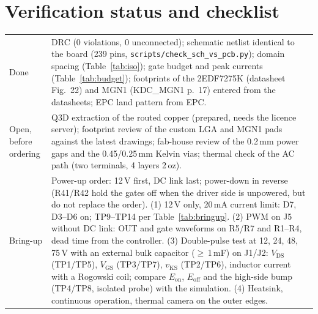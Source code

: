 \documentclass[10pt,a4paper]{article}
\begin{document}
\section{Verification status and checklist}
\begin{table}[H]
\centering\small
\begin{tabularx}{\textwidth}{@{}lX@{}}
\toprule
Done & DRC (0 violations, 0 unconnected); schematic netlist identical to the board (239 pins, \texttt{scripts/check\_sch\_vs\_pcb.py}); domain spacing (Table~\ref{tab:iso}); gate budget and peak currents (Table~\ref{tab:budget}); footprints of the 2EDF7275K (datasheet Fig.~22) and MGN1 (KDC\_MGN1 p.~17) entered from the datasheets; EPC land pattern from EPC. \\
Open, before ordering & Q3D extraction of the routed copper (prepared, needs the licence server); footprint review of the custom LGA and MGN1 pads against the latest drawings; fab-house review of the 0.2\,mm power gaps and the 0.45/0.25\,mm Kelvin vias; thermal check of the AC path (two terminals, 4 layers 2\,oz). \\
Bring-up & Power-up order: 12\,V first, DC link last; power-down in reverse (R41/R42 hold the gates off when the driver side is unpowered, but do not replace the order). (1) 12\,V only, 20\,mA current limit: D7, D3--D6 on; TP9--TP14 per Table~\ref{tab:bringup}. (2) PWM on J5 without DC link: OUT and gate waveforms on R5/R7 and R1--R4, dead time from the controller. (3) Double-pulse test at 12, 24, 48, 75\,V with an external bulk capacitor ($\geq$\,1\,mF) on J1/J2: $V_\mathrm{DS}$ (TP1/TP5), $V_\mathrm{GS}$ (TP3/TP7), $v_\mathrm{KS}$ (TP2/TP6), inductor current with a Rogowski coil; compare $E_\mathrm{on}$, $E_\mathrm{off}$ and the high-side bump (TP4/TP8, isolated probe) with the simulation. (4) Heatsink, continuous operation, thermal camera on the outer edges. \\
\bottomrule
\end{tabularx}
\end{table}
\end{document}

